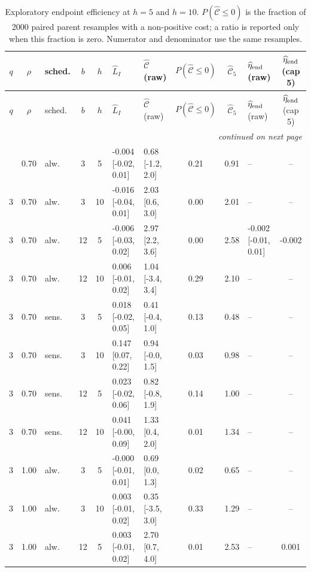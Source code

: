 \begin{scriptsize}
\setlength{\tabcolsep}{3pt}
\begin{longtable}{cclcc l l c c l c}
\caption{Exploratory endpoint efficiency at $h=5$ and $h=10$. $P(\widehat{\mathcal C}\le0)$ is the fraction of 2000 paired parent resamples with a non-positive cost; a ratio is reported only when this fraction is zero. Numerator and denominator use the same resamples.}\label{tab:efficiency}\\
\toprule
$q$ & $\rho$ & sched. & $b$ & $h$ & $\widehat L_I$ & $\widehat{\mathcal C}$ (raw) & $P(\widehat{\mathcal C}\le0)$ & $\widehat{\mathcal C}_5$ & $\widehat\eta_{\rm end}$ (raw) & $\widehat\eta_{\rm end}$ (cap 5) \\
\midrule
\endfirsthead
\toprule
$q$ & $\rho$ & sched. & $b$ & $h$ & $\widehat L_I$ & $\widehat{\mathcal C}$ (raw) & $P(\widehat{\mathcal C}\le0)$ & $\widehat{\mathcal C}_5$ & $\widehat\eta_{\rm end}$ (raw) & $\widehat\eta_{\rm end}$ (cap 5) \\
\midrule
\endhead
\midrule
\multicolumn{11}{r}{\emph{continued on next page}}\\
\endfoot
\bottomrule
\endlastfoot
3 & 0.70 & alw. & 3 & 5 & -0.004 [-0.02, 0.01] & 0.68 [-1.2, 2.0] & 0.21 & 0.91 & -- & -- \\
3 & 0.70 & alw. & 3 & 10 & -0.016 [-0.04, 0.01] & 2.03 [0.6, 3.0] & 0.00 & 2.01 & -- & -- \\
3 & 0.70 & alw. & 12 & 5 & -0.006 [-0.03, 0.02] & 2.97 [2.2, 3.6] & 0.00 & 2.58 & -0.002 [-0.01, 0.01] & -0.002 \\
3 & 0.70 & alw. & 12 & 10 & 0.006 [-0.01, 0.02] & 1.04 [-3.4, 3.4] & 0.29 & 2.10 & -- & -- \\
3 & 0.70 & sens. & 3 & 5 & 0.018 [-0.02, 0.05] & 0.41 [-0.4, 1.0] & 0.13 & 0.48 & -- & -- \\
3 & 0.70 & sens. & 3 & 10 & 0.147 [0.07, 0.22] & 0.94 [-0.0, 1.5] & 0.03 & 0.98 & -- & -- \\
3 & 0.70 & sens. & 12 & 5 & 0.023 [-0.02, 0.06] & 0.82 [-0.8, 1.9] & 0.14 & 1.00 & -- & -- \\
3 & 0.70 & sens. & 12 & 10 & 0.041 [-0.00, 0.09] & 1.33 [0.4, 2.0] & 0.01 & 1.34 & -- & -- \\
3 & 1.00 & alw. & 3 & 5 & -0.000 [-0.01, 0.01] & 0.69 [0.0, 1.3] & 0.02 & 0.65 & -- & -- \\
3 & 1.00 & alw. & 3 & 10 & 0.003 [-0.01, 0.02] & 0.35 [-3.5, 3.0] & 0.33 & 1.29 & -- & -- \\
3 & 1.00 & alw. & 12 & 5 & 0.003 [-0.01, 0.02] & 2.70 [0.7, 4.0] & 0.01 & 2.53 & -- & 0.001 \\

\end{longtable}
\end{scriptsize}
